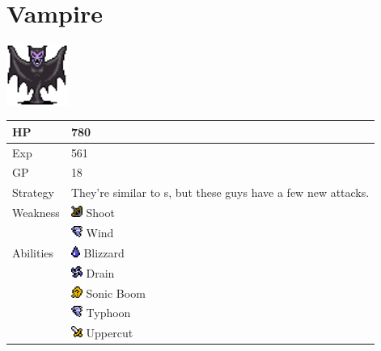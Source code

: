 \section{Vampire}
\label{monster:vampire}

\includegraphics[height=2cm,keepaspectratio]{./resources/monster/vampire}

\begin{longtable}{ l p{9cm} }
	HP
	& 780
\\ \hline
	Exp
	& 561
\\ \hline
	GP
	& 18
\\ \hline
	Strategy
	& They're similar to \nameref{monster:fangpire}s, but these guys have a few new attacks.
\\ \hline
	Weakness
	& \includegraphics[height=1em,keepaspectratio]{./resources/effects/shoot} Shoot \\
	& \includegraphics[height=1em,keepaspectratio]{./resources/effects/wind} Wind
\\ \hline
	Abilities
	& \includegraphics[height=1em,keepaspectratio]{./resources/effects/water} Blizzard \\
	& \includegraphics[height=1em,keepaspectratio]{./resources/effects/drain} Drain \\
	& \includegraphics[height=1em,keepaspectratio]{./resources/effects/confusion} Sonic Boom \\
	& \includegraphics[height=1em,keepaspectratio]{./resources/effects/wind} Typhoon \\
	& \includegraphics[height=1em,keepaspectratio]{./resources/effects/damage} Uppercut
\end{longtable}
